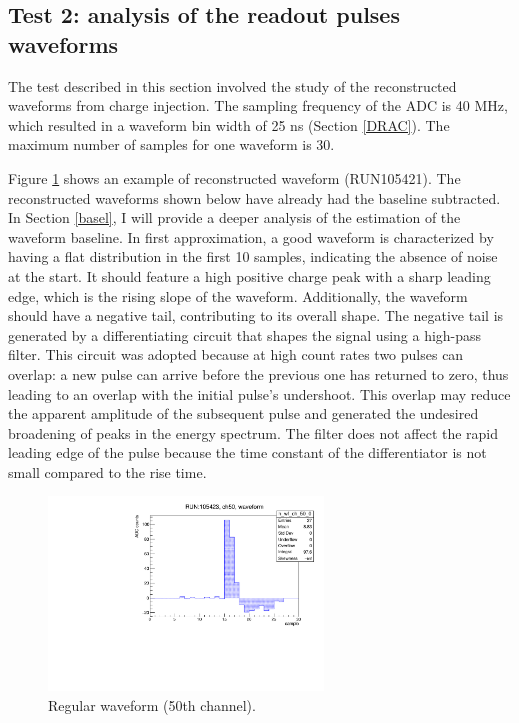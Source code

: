 \subsection{Test 2: analysis of the readout pulses waveforms}\label{wf}
The test described in this section involved the study 
of the reconstructed waveforms from charge injection. 
The sampling frequency of the ADC is 40 MHz, which resulted 
in a waveform bin width of 25 ns (Section \ref{DRAC}). 
The maximum number of samples for one waveform is 30. 


Figure \ref{fig:normalwf} shows an example 
of reconstructed waveform (RUN105421). 
The reconstructed waveforms shown below 
have already had the baseline subtracted. 
In Section \ref{basel}, I will provide a deeper 
analysis of the estimation of the waveform baseline. 
In first approximation, a good waveform is 
characterized by having a flat 
distribution in the first 10 samples, indicating the 
absence of noise at the start. It should feature a high 
positive charge peak with a sharp leading edge, which is 
the rising slope of the waveform. Additionally, the 
waveform should have a negative tail, contributing to 
its overall shape.
The negative tail is generated by a 
differentiating circuit that shapes the signal 
using a high-pass filter. This circuit was adopted 
because at high count rates two pulses can overlap: a 
new pulse can arrive before the previous one 
has returned to zero, thus leading to an overlap 
with the initial pulse's undershoot. This overlap 
may reduce the apparent amplitude of the subsequent 
pulse and generated the undesired broadening of peaks 
in the energy spectrum. 
The filter does not affect the rapid leading edge 
of the pulse because the time constant of the differentiator 
is not small compared to the rise time.

\begin{figure}[!h]
  \centering
  \includegraphics[width=0.65\textwidth]{figures/pdf/wf_ch50_0.pdf}
  \caption[A regular waveform.]{Regular waveform (50th channel).}
 \label{fig:normalwf}
\end{figure}



